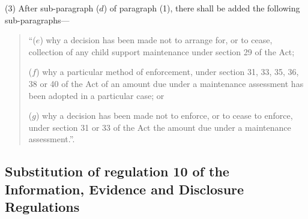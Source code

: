 \documentclass[12pt,a4paper]{article}
\begin{document}
(3) After sub-paragraph ($d$) of paragraph (1), there shall be added the following sub-paragraphs—
\begin{quotation}
“($e$) why a decision has been made not to arrange for, or to cease, collection of any child support maintenance under section 29 of the Act;

($f$) why a particular method of enforcement, under section 31, 33, 35, 36, 38 or 40 of the Act of an amount due under a maintenance assessment has been adopted in a particular case; or

($g$) why a decision has been made not to enforce, or to cease to enforce, under section 31 or 33 of the Act the amount due under a maintenance assessment.”.
\end{quotation}

\subsection[12. Substitution of regulation 10 of the Information, Evidence and Disclosure Regulations]{Substitution of regulation 10 of the Information, Evidence and Disclosure Regulations}
\end{document}
